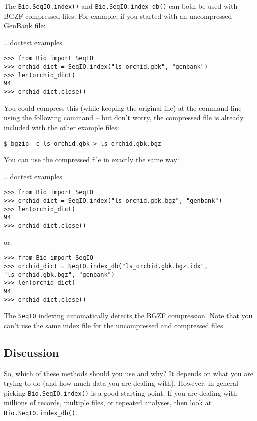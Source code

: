 The \verb|Bio.SeqIO.index()| and \verb|Bio.SeqIO.index_db()| can both be
used with BGZF compressed files. For example, if you started with an
uncompressed GenBank file:

\pandocignoreme .. doctest examples
\begin{verbatim}
>>> from Bio import SeqIO
>>> orchid_dict = SeqIO.index("ls_orchid.gbk", "genbank")
>>> len(orchid_dict)
94
>>> orchid_dict.close()
\end{verbatim}

You could compress this (while keeping the original file) at the command
line using the following command -- but don't worry, the compressed file
is already included with the other example files:

\begin{verbatim}
$ bgzip -c ls_orchid.gbk > ls_orchid.gbk.bgz
\end{verbatim}

You can use the compressed file in exactly the same way:

\pandocignoreme .. doctest examples
\begin{verbatim}
>>> from Bio import SeqIO
>>> orchid_dict = SeqIO.index("ls_orchid.gbk.bgz", "genbank")
>>> len(orchid_dict)
94
>>> orchid_dict.close()
\end{verbatim}

\noindent
or:

\begin{verbatim}
>>> from Bio import SeqIO
>>> orchid_dict = SeqIO.index_db("ls_orchid.gbk.bgz.idx", "ls_orchid.gbk.bgz", "genbank")
>>> len(orchid_dict)
94
>>> orchid_dict.close()
\end{verbatim}

The \verb|SeqIO| indexing automatically detects the BGZF compression. Note
that you can't use the same index file for the uncompressed and compressed files.

\subsection{Discussion}
\label{sec:SeqIO-indexing-discussion}

So, which of these methods should you use and why? It depends on what you are
trying to do (and how much data you are dealing with). However, in general
picking \verb|Bio.SeqIO.index()| is a good starting point. If you are dealing
with millions of records, multiple files, or repeated analyses, then look at
\verb|Bio.SeqIO.index_db()|.

